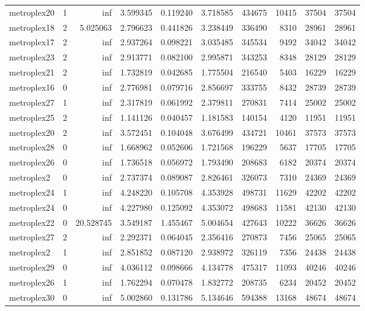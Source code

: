 \documentclass[../../../thesis.tex]{subfiles}
\begin{document}
\begin{longtable}{|l|r|r|r|r|r|r|r|r|r|}
metroplex20 & 1 & inf & 3.599345 & 0.119240 & 3.718585 & 434675 & 10415 & 37504 & 37504 \\
metroplex18 & 2 & 5.025063 & 2.796623 & 0.441826 & 3.238449 & 336490 & 8310 & 28961 & 28961 \\
metroplex17 & 2 & inf & 2.937264 & 0.098221 & 3.035485 & 345534 & 9492 & 34042 & 34042 \\
metroplex23 & 2 & inf & 2.913771 & 0.082100 & 2.995871 & 343253 & 8348 & 28129 & 28129 \\
metroplex21 & 2 & inf & 1.732819 & 0.042685 & 1.775504 & 216540 & 5403 & 16229 & 16229 \\
metroplex16 & 0 & inf & 2.776981 & 0.079716 & 2.856697 & 333755 & 8432 & 28739 & 28739 \\
metroplex27 & 1 & inf & 2.317819 & 0.061992 & 2.379811 & 270831 & 7414 & 25002 & 25002 \\
metroplex25 & 2 & inf & 1.141126 & 0.040457 & 1.181583 & 140154 & 4120 & 11951 & 11951 \\
metroplex20 & 2 & inf & 3.572451 & 0.104048 & 3.676499 & 434721 & 10461 & 37573 & 37573 \\
metroplex28 & 0 & inf & 1.668962 & 0.052606 & 1.721568 & 196229 & 5637 & 17705 & 17705 \\
metroplex26 & 0 & inf & 1.736518 & 0.056972 & 1.793490 & 208683 & 6182 & 20374 & 20374 \\
metroplex2 & 0 & inf & 2.737374 & 0.089087 & 2.826461 & 326073 & 7310 & 24369 & 24369 \\
metroplex24 & 1 & inf & 4.248220 & 0.105708 & 4.353928 & 498731 & 11629 & 42202 & 42202 \\
metroplex24 & 0 & inf & 4.227980 & 0.125092 & 4.353072 & 498683 & 11581 & 42130 & 42130 \\
metroplex22 & 0 & 20.528745 & 3.549187 & 1.455467 & 5.004654 & 427643 & 10222 & 36626 & 36626 \\
metroplex27 & 2 & inf & 2.292371 & 0.064045 & 2.356416 & 270873 & 7456 & 25065 & 25065 \\
metroplex2 & 1 & inf & 2.851852 & 0.087120 & 2.938972 & 326119 & 7356 & 24438 & 24438 \\
metroplex29 & 0 & inf & 4.036112 & 0.098666 & 4.134778 & 475317 & 11093 & 40246 & 40246 \\
metroplex26 & 1 & inf & 1.762294 & 0.070478 & 1.832772 & 208735 & 6234 & 20452 & 20452 \\
metroplex30 & 0 & inf & 5.002860 & 0.131786 & 5.134646 & 594388 & 13168 & 48674 & 48674 \\

\end{longtable}
\end{document}
